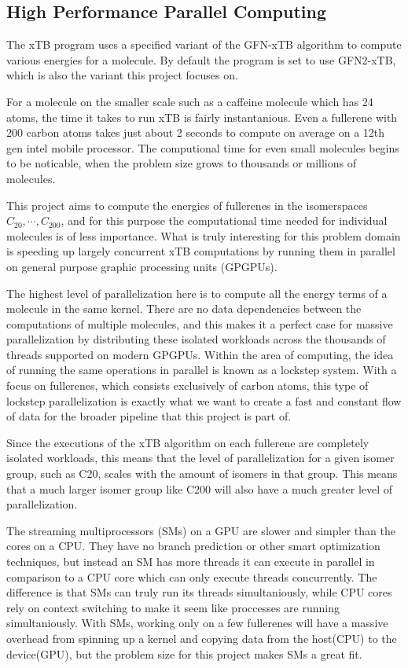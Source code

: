 
\subsection{High Performance Parallel Computing}

The xTB program uses a specified variant of the GFN-xTB algorithm to compute various energies for a molecule. By default the program is set to use GFN2-xTB, which is also the variant this project focuses on.

For a molecule on the smaller scale such as a caffeine molecule which has 24 atoms, the time it takes to run xTB is fairly instantanious. Even a fullerene with 200 carbon atoms takes just about 2 seconds to compute on average on a 12th gen intel mobile processor. The computional time for even small molecules begins to be noticable, when the problem size grows to thousands or millions of molecules.

This project aims to compute the energies of fullerenes in the isomerspaces \(C_{20}, \cdots, C_{200} \), and for this purpose the computational time needed for individual molecules is of less importance. What is truly interesting for this problem domain is speeding up largely concurrent xTB computations by running them in parallel on general purpose graphic processing units (GPGPUs).

The highest level of parallelization here is to compute all the energy terms of a molecule in the same kernel. There are no data dependencies between the computations of multiple molecules, and this makes it a perfect case for massive parallelization by distributing these isolated workloads across the thousands of threads supported on modern GPGPUs.
Within the area of computing, the idea of running the same operations in parallel is known as a lockstep system. With a focus on fullerenes, which consists exclusively of carbon atoms, this type of lockstep parallelization is exactly what we want to create a fast and constant flow of data for the broader pipeline that this project is part of.

Since the executions of the xTB algorithm on each fullerene are completely isolated workloads, this means that the level of parallelization for a given isomer group, such as C20, scales with the amount of isomers in that group. This means that a much larger isomer group like C200 will also have a much greater level of parallelization.

The streaming multiprocessors (SMs) on a GPU are slower and simpler than the cores on a CPU. They have no branch prediction or other smart optimization techniques, but instead an SM has more threads it can execute in parallel in comparison to a CPU core which can only execute threads concurrently. The difference is that SMs can truly run its threads simultaniously, while CPU cores rely on context switching to make it seem like proccesses are running simultaniously. With SMs, working only on a few fullerenes will have a massive overhead from spinning up a kernel and copying data from the host(CPU) to the device(GPU), but the problem size for this project makes SMs a great fit.

